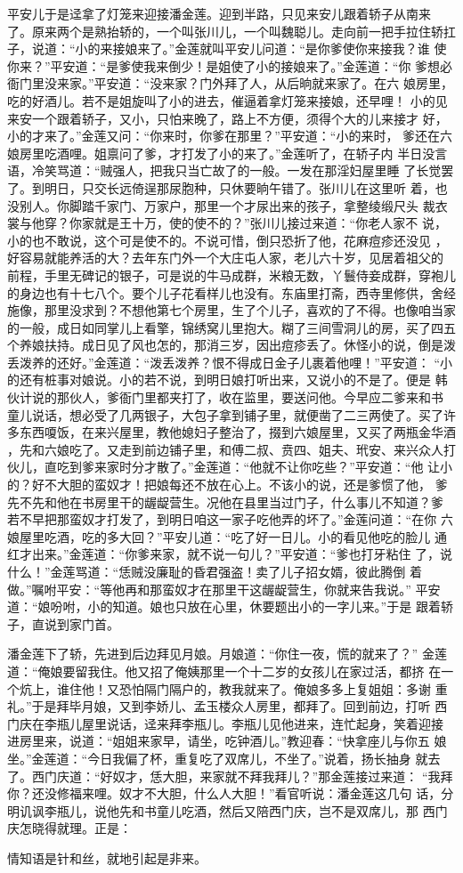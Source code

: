 平安儿于是迳拿了灯笼来迎接潘金莲。迎到半路，只见来安儿跟着轿子从南来
了。原来两个是熟抬轿的，一个叫张川儿，一个叫魏聪儿。走向前一把手拉住轿扛
子，说道：“小的来接娘来了。”金莲就叫平安儿问道：“是你爹使你来接我？谁
使你来？”平安道：“是爹使我来倒少！是姐使了小的接娘来了。”金莲道：“你
爹想必衙门里没来家。”平安道：“没来家？门外拜了人，从后晌就来家了。在六
娘房里，吃的好酒儿。若不是姐旋叫了小的进去，催逼着拿灯笼来接娘，还早哩！
小的见来安一个跟着轿子，又小，只怕来晚了，路上不方便，须得个大的儿来接才
好，小的才来了。”金莲又问：“你来时，你爹在那里？”平安道：“小的来时，
爹还在六娘房里吃酒哩。姐禀问了爹，才打发了小的来了。”金莲听了，在轿子内
半日没言语，冷笑骂道：“贼强人，把我只当亡故了的一般。一发在那淫妇屋里睡
了长觉罢了。到明日，只交长远倚逞那尿胞种，只休要晌午错了。张川儿在这里听
着，也没别人。你脚踏千家门、万家户，那里一个才尿出来的孩子，拿整绫缎尺头
裁衣裳与他穿？你家就是王十万，使的使不的？”张川儿接过来道：“你老人家不
说，小的也不敢说，这个可是使不的。不说可惜，倒只恐折了他，花麻痘疹还没见
，好容易就能养活的大？去年东门外一个大庄屯人家，老儿六十岁，见居着祖父的
前程，手里无碑记的银子，可是说的牛马成群，米粮无数，丫鬟侍妾成群，穿袍儿
的身边也有十七八个。要个儿子花看样儿也没有。东庙里打斋，西寺里修供，舍经
施像，那里没求到？不想他第七个房里，生了个儿子，喜欢的了不得。也像咱当家
的一般，成日如同掌儿上看擎，锦绣窝儿里抱大。糊了三间雪洞儿的房，买了四五
个养娘扶持。成日见了风也怎的，那消三岁，因出痘疹丢了。休怪小的说，倒是泼
丢泼养的还好。”金莲道：“泼丢泼养？恨不得成日金子儿裹着他哩！”平安道：
“小的还有桩事对娘说。小的若不说，到明日娘打听出来，又说小的不是了。便是
韩伙计说的那伙人，爹衙门里都夹打了，收在监里，要送问他。今早应二爹来和书
童儿说话，想必受了几两银子，大包子拿到铺子里，就便凿了二三两使了。买了许
多东西嗄饭，在来兴屋里，教他媳妇子整治了，掇到六娘屋里，又买了两瓶金华酒
，先和六娘吃了。又走到前边铺子里，和傅二叔、贲四、姐夫、玳安、来兴众人打
伙儿，直吃到爹来家时分才散了。”金莲道：“他就不让你吃些？”平安道：“他
让小的？好不大胆的蛮奴才！把娘每还不放在心上。不该小的说，还是爹惯了他，
爹先不先和他在书房里干的龌龊营生。况他在县里当过门子，什么事儿不知道？爹
若不早把那蛮奴才打发了，到明日咱这一家子吃他弄的坏了。”金莲问道：“在你
六娘屋里吃酒，吃的多大回？”平安儿道：“吃了好一日儿。小的看见他吃的脸儿
通红才出来。”金莲道：“你爹来家，就不说一句儿？”平安道：“爹也打牙粘住
了，说什么！”金莲骂道：“恁贼没廉耻的昏君强盗！卖了儿子招女婿，彼此腾倒
着做。”嘱咐平安：“等他再和那蛮奴才在那里干这龌龊营生，你就来告我说。”
平安道：“娘吩咐，小的知道。娘也只放在心里，休要题出小的一字儿来。”于是
跟着轿子，直说到家门首。

潘金莲下了轿，先进到后边拜见月娘。月娘道：“你住一夜，慌的就来了？”
金莲道：“俺娘要留我住。他又招了俺姨那里一个十二岁的女孩儿在家过活，都挤
在一个炕上，谁住他！又恐怕隔门隔户的，教我就来了。俺娘多多上复姐姐：多谢
重礼。”于是拜毕月娘，又到李娇儿、孟玉楼众人房里，都拜了。回到前边，打听
西门庆在李瓶儿屋里说话，迳来拜李瓶儿。李瓶儿见他进来，连忙起身，笑着迎接
进房里来，说道：“姐姐来家早，请坐，吃钟酒儿。”教迎春：“快拿座儿与你五
娘坐。”金莲道：“今日我偏了杯，重复吃了双席儿，不坐了。”说着，扬长抽身
就去了。西门庆道：“好奴才，恁大胆，来家就不拜我拜儿？”那金莲接过来道：
“我拜你？还没修福来哩。奴才不大胆，什么人大胆！”看官听说：潘金莲这几句
话，分明讥讽李瓶儿，说他先和书童儿吃酒，然后又陪西门庆，岂不是双席儿，那
西门庆怎晓得就理。正是：

情知语是针和丝，就地引起是非来。